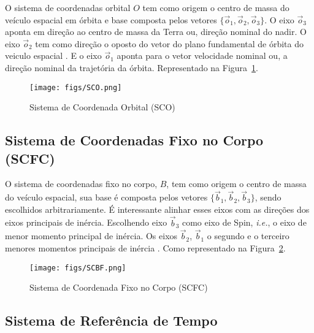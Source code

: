 O sistema de coordenadas orbital \begin{math}O\end{math} tem como origem o centro de massa do veículo espacial em órbita e base composta pelos vetores \begin{math}\{\vec{o}_1,\vec{o}_2,\vec{o}_3\}\end{math}. O eixo $\vec{o}_3$ aponta em direção ao centro de massa da Terra ou, direção nominal do nadir. O eixo $\vec{o}_2$ tem como direção o oposto do vetor do plano fundamental de órbita do veiculo espacial \cite[p.~26-29]{wertz2012spacecraft}. E o eixo $\vec{o}_1$ aponta para o vetor velocidade nominal ou, a direção nominal da trajetória da órbita. Representado na Figura~\ref{fig:12}.

\begin{figure}[htpb]
\centering
\texttt{[image: figs/SCO.png]}
\caption{Sistema de Coordenada Orbital (SCO)}
\label{fig:12}
\end{figure}

\subsection{Sistema de Coordenadas Fixo no Corpo (SCFC)}\label{sec:3.1.1.3}

O sistema de coordenadas fixo no corpo, \begin{math}B\end{math}, tem como origem o centro de massa do veículo espacial, sua base é composta pelos vetores \begin{math}\{\vec{b}_1,\vec{b}_2,\vec{b}_3\}\end{math}, sendo escolhidos arbitrariamente. É interessante alinhar esses eixos com as direções dos eixos principais de inércia. Escolhendo eixo $\vec{b}_3$ como eixo de Spin, \textit{i.e.}, o eixo de menor momento principal de inércia. Os eixos $\vec{b}_2$, $\vec{b}_1$ o segundo e o terceiro menores momentos principais de inércia \cite[p.~26-29]{wertz2012spacecraft}. Como representado na Figura~\ref{fig:13}.

\begin{figure}[htpb]
\centering
\texttt{[image: figs/SCBF.png]}
\caption{Sistema de Coordenada Fixo no Corpo (SCFC)}
\label{fig:13}
\end{figure}

\subsection{Sistema de Referência de Tempo}\label{sec:3.1.1.4}

